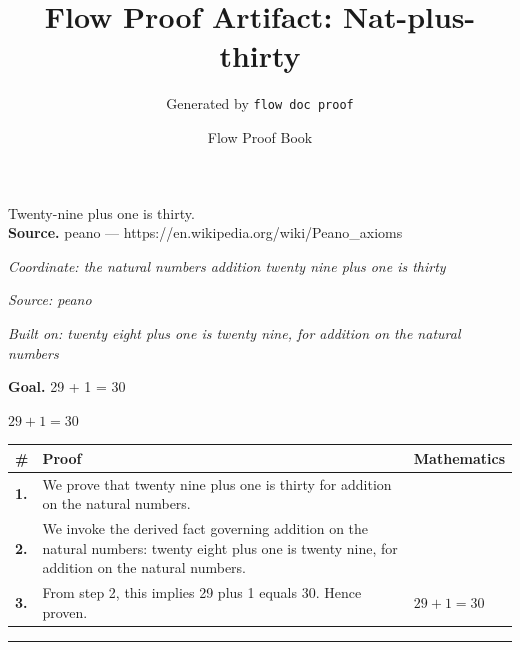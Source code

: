 \documentclass[11pt]{article}
\title{Flow Proof Artifact: Nat-plus-thirty}
\author{Generated by \texttt{flow doc proof}}
\date{Flow Proof Book}
\theoremstyle{definition}
\begin{document}
\maketitle
Twenty-nine plus one is thirty.\\[0.5em]
\textbf{Source.} peano — https://en.wikipedia.org/wiki/Peano\_axioms\\[0.5em]
\bigskip
{}\par
\smallskip\noindent\textit{Coordinate: the natural numbers \cdot addition \cdot twenty nine plus one is thirty}\par
\smallskip\noindent\textit{Source: peano}\par
\smallskip\noindent\textit{Built on: twenty eight plus one is twenty nine, for addition on the natural numbers}\par
\medskip
\noindent\textbf{Goal.} 29 + 1 = 30\par
\noindent$\displaystyle 29 + 1 = 30$\par
\medskip
\noindent
\begin{tabular}{@{} >{\raggedright\arraybackslash}p{} >{\raggedright\arraybackslash}p{} >{\raggedleft\arraybackslash}p{} @{}}
\textbf{\#} & \textbf{Proof} & \textbf{Mathematics} \\
\midrule
\textbf{1.} & We prove that twenty nine plus one is thirty for addition on the natural numbers. & \\[0.45em]
\textbf{2.} & We invoke the derived fact governing addition on the natural numbers: twenty eight plus one is twenty nine, for addition on the natural numbers. & \\[0.45em]
\textbf{3.} & From step 2, this implies 29 plus 1 equals 30. Hence proven. & $\displaystyle 29 + 1 = 30$ \\[0.45em]
\bottomrule
\end{tabular}
\label{thm:Nat-addition-twenty_nine_plus_one_is_thirty}
\par\medskip\hrule
\end{document}
